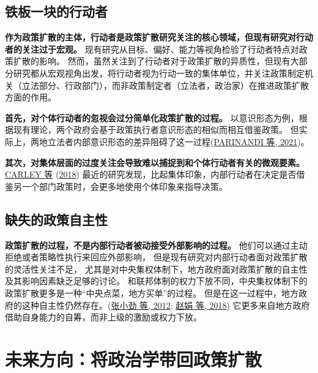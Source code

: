 \documentclass[
  12pt,
]{ctexart}
\begin{document}
\hypertarget{ux94c1ux677fux4e00ux5757ux7684ux884cux52a8ux8005}{%
\subsection{铁板一块的行动者}\label{ux94c1ux677fux4e00ux5757ux7684ux884cux52a8ux8005}}

\textbf{作为政策扩散的主体，行动者是政策扩散研究关注的核心领域，但现有研究对行动者的关注过于宏观。}
现有研究从目标、偏好、能力等视角检验了行动者特点对政策扩散的影响。
然而，虽然关注到了行动者对于政策扩散的异质性，但现有大部分研究都从宏观视角出发，将行动者视为行动一致的集体单位，并关注政策制定机关（立法部分、行政部门），而非政策制定者（立法者，政治家）在推进政策扩散方面的作用。

\textbf{首先，对个体行动者的忽视会过分简单化政策扩散的过程。}
以意识形态为例，根据现有理论，两个政府会基于政策执行者意识形态的相似而相互借鉴政策。
但实际上，两地立法者内部意识形态的差异阻碍了这一过程(\protect\hyperlink{ref-ParinandiEtAl2021}{PARINANDI 等, 2021})。

\textbf{其次，对集体层面的过度关注会导致难以捕捉到和个体行动者有关的微观要素。}
\protect\hyperlink{ref-CarleyNicholson-Crotty2018}{CARLEY 等} (\protect\hyperlink{ref-CarleyNicholson-Crotty2018}{2018}) 最近的研究发现，比起集体印象，内部行动者在决定是否借鉴另一个部门政策时，会更多地使用个体印象来指导决策。

\hypertarget{ux7f3aux5931ux7684ux653fux7b56ux81eaux4e3bux6027}{%
\subsection{缺失的政策自主性}\label{ux7f3aux5931ux7684ux653fux7b56ux81eaux4e3bux6027}}

\textbf{政策扩散的过程，不是内部行动者被动接受外部影响的过程。}
他们可以通过主动拒绝或者策略性执行来回应外部影响，
但是现有研究对内部行动者面对政策扩散的灵活性关注不足，
尤其是对中央集权体制下，地方政府面对政策扩散的自主性及其影响因素缺乏足够的讨论。
和联邦体制的权力下放不同，中央集权体制下的政策扩散更多是一种``中央点菜，地方买单''的过程。
但是在这一过程中，地方政府的这种自主性仍然存在。(\protect\hyperlink{ref-ZhangXiaoJingYuXiaoHong2012}{张小劲 等, 2012}; \protect\hyperlink{ref-ZhaoJuanMengTianGuang2018}{赵娟 等, 2018})
它更多来自地方政府借助自身能力的自筹，而非上级的激励或权力下放。

\newpage

\hypertarget{ux672aux6765ux65b9ux5411ux5c06ux653fux6cbbux5b66ux5e26ux56deux653fux7b56ux6269ux6563}{%
\section{未来方向：将政治学带回政策扩散}\label{ux672aux6765ux65b9ux5411ux5c06ux653fux6cbbux5b66ux5e26ux56deux653fux7b56ux6269ux6563}}
\end{document}
